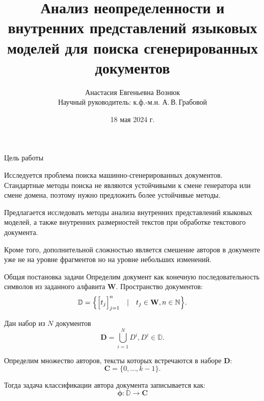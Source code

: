 \documentclass{beamer}
\title{{Анализ неопределенности и внутренних представлений языковых моделей для поиска сгенерированных документов}}
\author{
    Анастасия Евгеньевна Вознюк\\
    Научный руководитель: к.ф.-м.н. А.\,В.\,Грабовой
}
\date{18 мая 2024 г.}
\institute[МФТИ (НИУ)]{
    Кафедра интеллектуальных систем ФПМИ МФТИ\\
    Специализация: Интеллектуальный анализ данных\\
}
\date{\footnotesize
\par\bigskip\small 17 мая 2024}
\begin{document}
\begin{frame}
\thispagestyle{empty}
\maketitle
\end{frame}
\begin{frame}{Цель работы}

Исследуется проблема поиска машинно-сгенерированных документов. Стандартные методы поиска не являются устойчивыми к смене генератора или смене домена, поэтому нужно предложить более устойчивые методы.

Предлагается исследовать методы анализа внутренних представлений языковых моделей, а также внутренних размерностей текстов при обработке текстового документа. 

Кроме того, дополнительной сложностью является смешение авторов в документе уже не на уровне фрагментов но на уровне небольших изменений.



\end{frame}

\begin{frame}{Общая постановка задачи}
Определим документ как конечную последовательность символов из заданного алфавита $\mathbf{W}$. Пространство документов:
$$\mathbb{D} = \Bigl\{\Big[t_j\Big]_{j=1}^n \quad|\quad t_j \in \mathbf{W}, n \in \mathbb{N}\Bigr\}.$$

Дан набор из $N$ документов
$$\mathbf{D} = \bigcup_{i=1}^{N}D^i, D^i \in \mathbb{D}.$$

Определим множество авторов, тексты которых встречаются в наборе $\mathbf{D}$:
$$\mathbf{C} = \{0, \dots, k - 1\}.$$


Тогда задача классификации автора документа записывается как: 
\begin{equation}
    \mathbf{\phi}: \mathbb{D} \rightarrow \mathbf{C}
\end{equation}
\end{frame}
\end{document}
